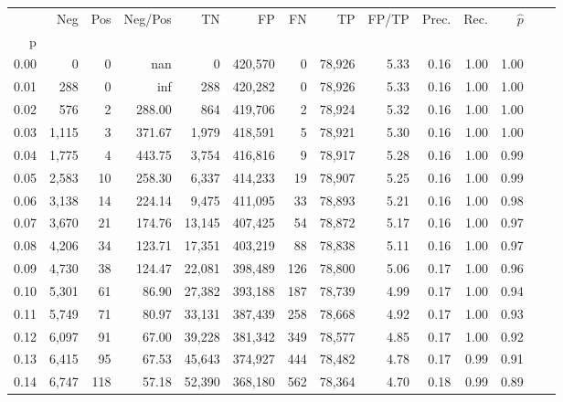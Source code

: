 \begin{tabular}{rrrrrrrrrrrrrr}
\toprule
{} &    Neg &    Pos & Neg/Pos &       TN &       FP &      FN &      TP & FP/TP & Prec. &  Rec. & $\hat{p}$ \\
p    &        &        &         &          &          &         &         &       &       &       &           \\
\midrule
0.00 &      0 &      0 &     nan &        0 &  420,570 &       0 &  78,926 &  5.33 &  0.16 &  1.00 &      1.00 \\
0.01 &    288 &      0 &     inf &      288 &  420,282 &       0 &  78,926 &  5.33 &  0.16 &  1.00 &      1.00 \\
0.02 &    576 &      2 &  288.00 &      864 &  419,706 &       2 &  78,924 &  5.32 &  0.16 &  1.00 &      1.00 \\
0.03 &  1,115 &      3 &  371.67 &    1,979 &  418,591 &       5 &  78,921 &  5.30 &  0.16 &  1.00 &      1.00 \\
0.04 &  1,775 &      4 &  443.75 &    3,754 &  416,816 &       9 &  78,917 &  5.28 &  0.16 &  1.00 &      0.99 \\
0.05 &  2,583 &     10 &  258.30 &    6,337 &  414,233 &      19 &  78,907 &  5.25 &  0.16 &  1.00 &      0.99 \\
0.06 &  3,138 &     14 &  224.14 &    9,475 &  411,095 &      33 &  78,893 &  5.21 &  0.16 &  1.00 &      0.98 \\
0.07 &  3,670 &     21 &  174.76 &   13,145 &  407,425 &      54 &  78,872 &  5.17 &  0.16 &  1.00 &      0.97 \\
0.08 &  4,206 &     34 &  123.71 &   17,351 &  403,219 &      88 &  78,838 &  5.11 &  0.16 &  1.00 &      0.97 \\
0.09 &  4,730 &     38 &  124.47 &   22,081 &  398,489 &     126 &  78,800 &  5.06 &  0.17 &  1.00 &      0.96 \\
0.10 &  5,301 &     61 &   86.90 &   27,382 &  393,188 &     187 &  78,739 &  4.99 &  0.17 &  1.00 &      0.94 \\
0.11 &  5,749 &     71 &   80.97 &   33,131 &  387,439 &     258 &  78,668 &  4.92 &  0.17 &  1.00 &      0.93 \\
0.12 &  6,097 &     91 &   67.00 &   39,228 &  381,342 &     349 &  78,577 &  4.85 &  0.17 &  1.00 &      0.92 \\
0.13 &  6,415 &     95 &   67.53 &   45,643 &  374,927 &     444 &  78,482 &  4.78 &  0.17 &  0.99 &      0.91 \\
0.14 &  6,747 &    118 &   57.18 &   52,390 &  368,180 &     562 &  78,364 &  4.70 &  0.18 &  0.99 &      0.89 \\

\end{tabular}
